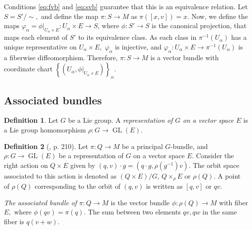 \documentclass[12pt, letterpaper, reqno]{amsart}
\theoremstyle{definition}
\newtheorem{df}{Definition}
\theoremstyle{plain}
\theoremstyle{remark}
\begin{document}
Conditions \eqref{eq:fvb} and \eqref{eq:svb} guarantee that this is an equivalence relation. Let $ S=S'/\sim, $ and define the map $ \pi: S \rightarrow M $ as $ \pi([x,v])=x. $ Now, we define the maps $ \varphi_\alpha = \phi|_{U_\alpha\times E}: U_\alpha\times E \rightarrow S $, where $ \phi: S' \rightarrow S $ is the canonical projection, that maps each element of $ S' $ to its equivalence class. As each class in $ \pi^{-1}(U_\alpha) $ has a unique representative on $ U_\alpha\times E, $ $ \varphi_\alpha $ is injective, and $ \varphi_\alpha : U_\alpha\times E \rightarrow \pi^{-1}(U_\alpha) $ is a fiberwise diffeomorphism. Therefore, $ \pi: S \rightarrow M $ is a vector bundle with coordinate chart $ \left\{ (U_\alpha, \phi|_{U_\alpha\times E}) \right\}_\alpha.  $ 
 \subsection{Associated bundles}%
 \label{sub:associated_bundles}

\begin{df}
	Let $ G $ be a Lie group. A \textit{representation of $ G $ on a vector space $ E $} is a Lie group homomorphism $ \rho: G \rightarrow \operatorname{GL} (E). $ 
\end{df}

\begin{df}[\cite{montgomery2002tour}, p. 210]
	Let $ \pi: Q \rightarrow M $ be a principal $ G $-bundle, and $ \rho: G \rightarrow \operatorname{GL}(E) $ be a representation of $ G $ on a vector space $ E. $ Consider the right action on $ Q\times E $ given by $ (q,v)\cdot g = (q\cdot g, \rho(g^{-1})v). $  The orbit space associated to this action is denoted as $ (Q\times E)/G $, $ Q\times_\rho E $ or $ \rho(Q). $  A point of $ \rho(Q) $ corresponding to the orbit of $ (q,v) $ is written as $ [q,v] $ or $ qv. $  

	\textit{The associated bundle of $ \pi:Q \rightarrow M $ } is the vector bundle $ \phi: \rho(Q) \rightarrow M $ with fiber $ E, $ where $ \phi(qv)=\pi(q). $ The sum between two elements $ qv,qw$ in the same fiber is $ q(v+w). $  
\end{df}
\end{document}
